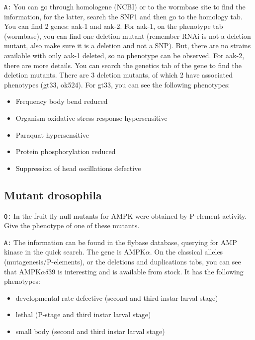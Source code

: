 \documentclass[11pt, a4paper,titlepage]{article}
\begin{document}
\noindent\texttt{A:} You can go through homologene (NCBI) or to the
wormbase site to find the information, for the latter, search the SNF1
and then go to the homology tab. You can find 2 genes: aak-1 and
aak-2. For aak-1, on the phenotype tab (wormbase), you can find one
deletion mutant (remember RNAi is not a deletion mutant, also make
sure it is a deletion and not a SNP). But, there are no strains
available with only aak-1 deleted, so no phenotype can be
observed. For aak-2, there are more details. You can search the
genetics tab of the gene to find the deletion mutants. There are 3
deletion mutants, of which 2 have associated phenotypes (gt33,
ok524). For gt33, you can see the following phenotypes:
\begin{itemize}
\itemsep0em
\item Frequency body bend reduced
\item Organism oxidative stress response hypersensitive
\item Paraquat hypersensitive
\item Protein phosphorylation reduced
\item Suppression of head oscillations defective
\end{itemize} 

\subsection*{Mutant drosophila}

\texttt{Q:} In the fruit fly null mutants for AMPK were obtained by
P-element activity. Give the phenotype of one of these mutants.
\smallskip

\noindent\texttt{A:} The information can be found in the flybase
database, querying for AMP kinase in the quick search. The gene is
AMPK$\alpha$. On the classical alleles (mutagenesis/P-elements), or
the deletions and duplications tabs, you can see that
AMPK$\alpha\delta$39 is interesting and is available from stock. It
has the following phenotypes:
\begin{itemize}
\itemsep0em
\item developmental rate defective (second and third instar larval stage)
\item lethal (P-stage and third instar larval stage)
\item small body (second and third instar larval stage)
\end{itemize} 
\end{document}
